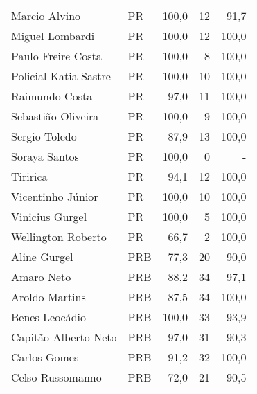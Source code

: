 \begin{longtable}{llrrr}
                       Marcio Alvino &             PR &     100,0 &           12 &       91,7 \\
                     Miguel Lombardi &             PR &     100,0 &           12 &      100,0 \\
                  Paulo Freire Costa &             PR &     100,0 &            8 &      100,0 \\
               Policial Katia Sastre &             PR &     100,0 &           10 &      100,0 \\
                      Raimundo Costa &             PR &      97,0 &           11 &      100,0 \\
                  Sebastião Oliveira &             PR &     100,0 &            9 &      100,0 \\
                       Sergio Toledo &             PR &      87,9 &           13 &      100,0 \\
                       Soraya Santos &             PR &     100,0 &            0 &          - \\
                            Tiririca &             PR &      94,1 &           12 &      100,0 \\
                   Vicentinho Júnior &             PR &     100,0 &           10 &      100,0 \\
                     Vinicius Gurgel &             PR &     100,0 &            5 &      100,0 \\
                  Wellington Roberto &             PR &      66,7 &            2 &      100,0 \\
                        Aline Gurgel &            PRB &      77,3 &           20 &       90,0 \\
                          Amaro Neto &            PRB &      88,2 &           34 &       97,1 \\
                      Aroldo Martins &            PRB &      87,5 &           34 &      100,0 \\
                      Benes Leocádio &            PRB &     100,0 &           33 &       93,9 \\
                Capitão Alberto Neto &            PRB &      97,0 &           31 &       90,3 \\
                        Carlos Gomes &            PRB &      91,2 &           32 &      100,0 \\
                    Celso Russomanno &            PRB &      72,0 &           21 &       90,5 \\

\end{longtable}
